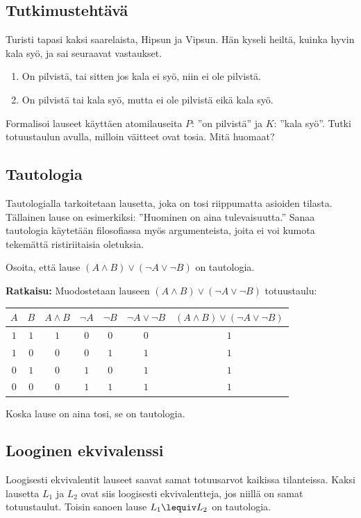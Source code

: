 \subsection*{Tutkimustehtävä}
Turisti tapasi kaksi saarelaista, Hipsun ja Vipsun. Hän kyseli heiltä, kuinka hyvin kala syö, ja sai seuraavat vastaukset.
\begin{enumerate}
\item On pilvistä, tai sitten jos kala ei syö, niin ei ole pilvistä.
\item On pilvistä tai kala syö, mutta ei ole pilvistä eikä kala syö.
\end{enumerate}
Formalisoi lauseet käyttäen atomilauseita $P$: ''on pilvistä'' ja $K$: ''kala syö''. Tutki totuustaulun avulla, milloin väitteet ovat tosia. Mitä huomaat?

\subsection*{Tautologia}
Tautologialla tarkoitetaan lausetta, joka on tosi riippumatta asioiden tilasta. Tällainen lause on esimerkiksi: ''Huominen on aina tulevaisuutta.'' Sanaa tautologia käytetään filosofiassa myös argumenteista, joita ei voi kumota tekemättä ristiriitaisia oletuksia.

\begin{esimerkki}
Osoita, että lause $(A\land B)\lor (\lnot A \lor \lnot B)$ on
tautologia.

{\bf Ratkaisu:}
Muodostetaan lauseen $(A\land B)\lor (\lnot A \lor \lnot
B)$ totuustaulu:

\begin{center}
\begin{tabular}{|c|c|c|c|c|c|c|}\hline
$A$ & $B$ & $A\land B$ & $\lnot A$ & $\lnot B$ & $ \lnot
A \lor \lnot B $ & $(A\land B)\lor (\lnot A \lor \lnot B)$
\\ \hline
$1$ & $1$ & $1$ & $0$ & $0$ & $0$ & $1$ \\ %
$1$ & $0$ & $0$ & $0$ & $1$ & $1$ & $1$ \\
$0$ & $1$ & $0$ & $1$ & $0$ & $1$ & $1$ \\
$0$ & $0$ & $0$ & $1$ & $1$ & $1$ & $1$ \\ \hline
\end{tabular}
\end{center}

Koska lause on aina tosi, se on tautologia.
\end{esimerkki}

\subsection*{Looginen ekvivalenssi}  Loogisesti
ekvivalentit lauseet saavat samat totuusarvot
kaikissa tilanteissa. Kaksi lausetta $L_1$ ja
$L_2$ ovat siis  loogisesti ekvivalentteja, jos niillä
on samat totuustaulut. Toisin sanoen lause $L_1 \lequiv L_2$ on tautologia.

